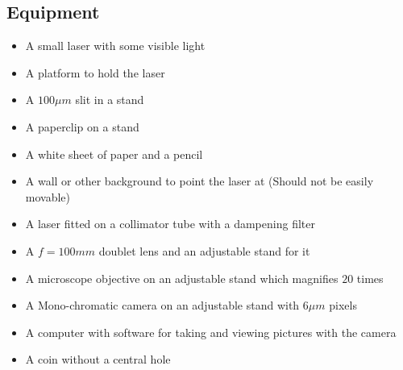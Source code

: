 \documentclass[11pt, A4paper, english]{article}
\begin{document}
\begin{multicols}{2}
		\section{Equipment}
			\begin{itemize}
\item A small laser with some visible light
\item A platform to hold the laser
\item A $100 \mu m$ slit in a stand
\item A paperclip on a stand
\item A white sheet of paper and a pencil
\item A wall or other background to point the laser at (Should not be easily movable)
\item A laser fitted on a collimator tube with a dampening filter
\item A $f = 100 mm$ doublet lens and an adjustable stand for it
\item A microscope objective on an adjustable stand which magnifies $20$ times
\item A Mono-chromatic camera on an adjustable stand with $6 \mu m$ pixels
\item A computer with software for taking and viewing pictures with the camera
\item A coin without a central hole
			\end{itemize}



\end{multicols}
\end{document}
